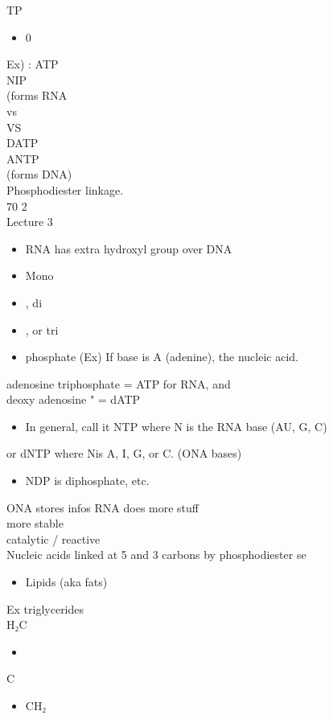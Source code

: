 \documentclass{article}
\begin{document}
TP\begin{itemize}\item 0
\end{itemize}
Ex) : ATP\\
NIP\\
(forms RNA\\
vs\\
VS\\
DATP\\
ANTP\\
(forms DNA)\\
Phosphodiester linkage.\\
70 2\\
Lecture 3\\
\begin{itemize}\item RNA has extra hydroxyl group over DNA
\item  Mono\item , di\item , or tri\item phosphate
(Ex) If base is A (adenine), the nucleic acid.
\end{itemize}
adenosine triphosphate = ATP for RNA, and\\
deoxy adenosine " = dATP\\
\begin{itemize}\item  In general, call it NTP where N is the RNA base (AU, G, C)
\end{itemize}
or dNTP where Nis A, I, G, or C. (ONA bases)\\
\begin{itemize}\item  NDP is diphosphate, etc.
\end{itemize}
ONA stores infos RNA does more stuff\\
more stable\\
catalytic / reactive\\
Nucleic acids linked at 5 and 3 carbons by phosphodiester se\\
\begin{itemize}\item  Lipids (aka fats)
\end{itemize}
Ex triglycerides\\
H₂C \begin{itemize}\item 
\end{itemize}
C \begin{itemize}\item  CH₂
\end{itemize}
\end{document}
